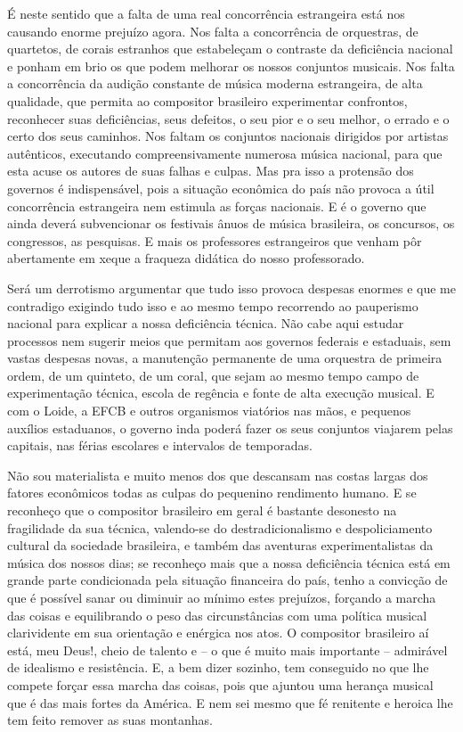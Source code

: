 É neste sentido que a falta de uma real concorrência estrangeira está
nos causando enorme prejuízo agora. Nos falta a concorrência de
orquestras, de quartetos, de corais estranhos que estabeleçam o
contraste da deficiência nacional e ponham em brio os que podem melhorar
os nossos conjuntos musicais. Nos falta a concorrência da audição
constante de música moderna estrangeira, de alta qualidade, que permita
ao compositor brasileiro experimentar confrontos, reconhecer suas
deficiências, seus defeitos, o seu pior e o seu melhor, o errado e o
certo dos seus caminhos. Nos faltam os conjuntos nacionais dirigidos por
artistas autênticos, executando compreensivamente numerosa música
nacional, para que esta acuse os autores de suas falhas e culpas. Mas
pra isso a protensão dos governos é indispensável, pois a situação
econômica do país não provoca a útil concorrência estrangeira nem
estimula as forças nacionais. E é o governo que ainda deverá
subvencionar os festivais ânuos de música brasileira, os concursos, os
congressos, as pesquisas. E mais os professores estrangeiros que venham
pôr abertamente em xeque a fraqueza didática do nosso professorado.

Será um derrotismo argumentar que tudo isso provoca despesas enormes e
que me contradigo exigindo tudo isso e ao mesmo tempo recorrendo ao
pauperismo nacional para explicar a nossa deficiência técnica. Não cabe
aqui estudar processos nem sugerir meios que permitam aos governos
federais e estaduais, sem vastas despesas novas, a manutenção permanente
de uma orquestra de primeira ordem, de um quinteto, de um coral, que
sejam ao mesmo tempo campo de experimentação técnica, escola de regência
e fonte de alta execução musical. E com o Loide, a EFCB e outros
organismos viatórios nas mãos, e pequenos auxílios estaduanos, o governo
inda poderá fazer os seus conjuntos viajarem pelas capitais, nas férias
escolares e intervalos de temporadas.

Não sou materialista e muito menos dos que descansam nas costas largas
dos fatores econômicos todas as culpas do pequenino rendimento humano. E
se reconheço que o compositor brasileiro em geral é bastante desonesto
na fragilidade da sua técnica, valendo-se do destradicionalismo e
despoliciamento cultural da sociedade brasileira, e também das aventuras
experimentalistas da música dos nossos dias; se reconheço mais que a
nossa deficiência técnica está em grande parte condicionada pela
situação financeira do país, tenho a convicção de que é possível sanar
ou diminuir ao mínimo estes prejuízos, forçando a marcha das coisas e
equilibrando o peso das circunstâncias com uma política musical
clarividente em sua orientação e enérgica nos atos. O compositor
brasileiro aí está, meu Deus!, cheio de talento e -- o que é muito mais
importante -- admirável de idealismo e resistência. E, a bem dizer
sozinho, tem conseguido no que lhe compete forçar essa marcha das
coisas, pois que ajuntou uma herança musical que é das mais fortes da
América. E nem sei mesmo que fé renitente e heroica lhe tem feito
remover as suas montanhas.

